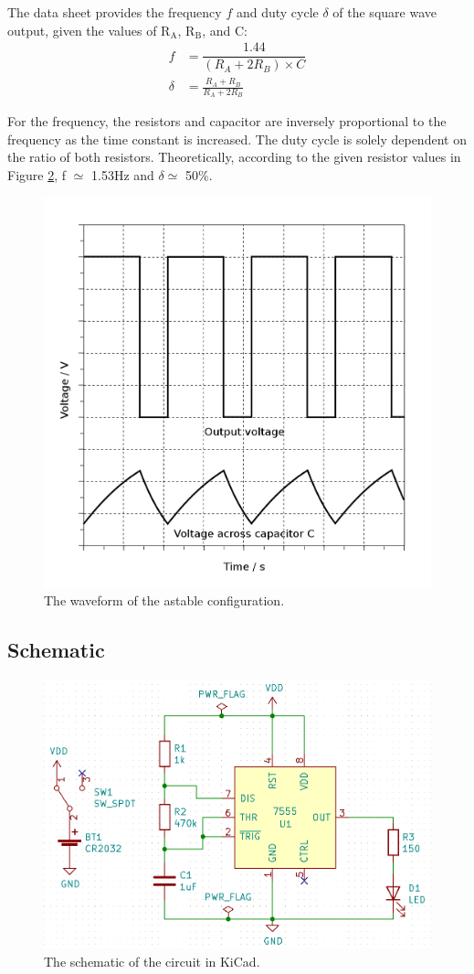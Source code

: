 \documentclass[10pt,twocolumn]{article}
\begin{document}
\noindent
The data sheet provides the frequency $f$ and duty cycle $\delta$ of the square wave output, given the values of ${\mbox{R}}_{\mbox{A}}$, ${\mbox{R}}_{\mbox{B}}$, and C:
\begin{align*}
f &= \dfrac{1.44}{(R_A+2R_B)\times{C}}
\\
\delta &= \frac{R_{A}+R_{B}}{R_{A}+2R_{B}}
\end{align*}

\noindent
For the frequency, the resistors and capacitor are inversely proportional to the frequency as the time constant is increased. The duty cycle is solely dependent on the ratio of both resistors. Theoretically, according to the given resistor values in Figure \ref{fig4}, f $\simeq$ 1.53Hz and $\delta \simeq$ 50\%.

\begin{figure}[H]
	\centering
	\includegraphics[width=0.7\linewidth]{images/astable-waveform.png}
	\caption{The waveform of the astable configuration.}
	\label{fig3}
\end{figure}

\subsection{Schematic}

\begin{figure}[H]
	\centering
	\includegraphics[width=1\linewidth]{images/schematic.png}
	\caption{The schematic of the circuit in KiCad.}
	\label{fig4}
\end{figure}
\end{document}

